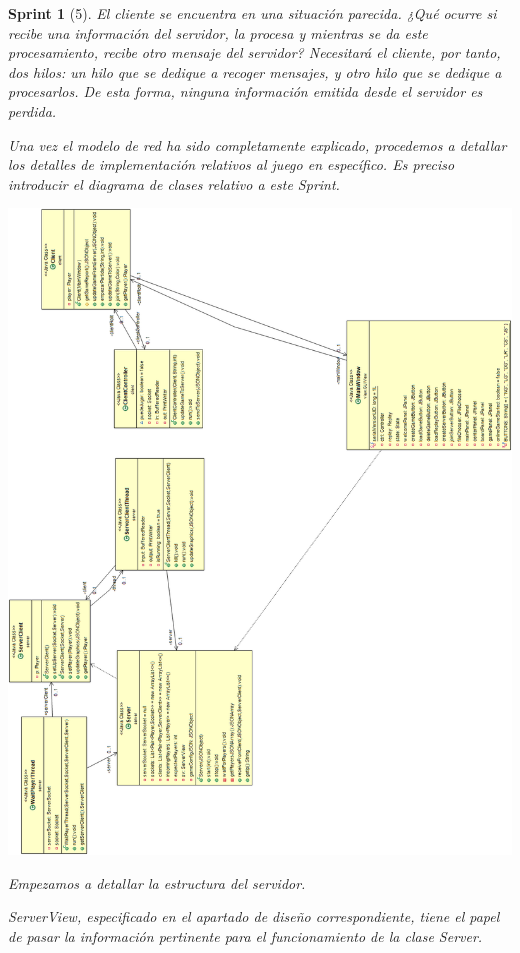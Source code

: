 \documentclass[12pt,a4paper,openright]{book}
\theoremstyle{break}
\newtheorem*{sprint}{Sprint}
\begin{document}
\begin{sprint}[5]
El cliente se encuentra en una situación parecida. ¿Qué ocurre si recibe una información del servidor, la procesa y mientras se da este procesamiento, recibe otro mensaje del servidor? Necesitará el cliente, por tanto, dos hilos: un hilo que se dedique a recoger mensajes, y otro hilo que se dedique a procesarlos. De esta forma, ninguna información emitida desde el servidor es perdida.

Una vez el modelo de red ha sido completamente explicado, procedemos a detallar los detalles de implementación relativos al juego en específico. Es preciso introducir el diagrama de clases relativo a este Sprint.

\begin{center}
\includegraphics[scale=0.45]{UMLClasesRedSprint5.png} 
\end{center}

Empezamos a detallar la estructura del servidor.

ServerView, especificado en el apartado de diseño correspondiente, tiene el papel de pasar la información pertinente para el funcionamiento de la clase Server.


\end{sprint}
\end{document}
